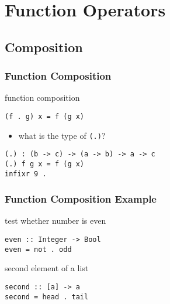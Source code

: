 \documentclass[dvipsnames]{beamer}
\theoremstyle{plain}
\begin{document}
\section{Function Operators}

\subsection{Composition}

\begin{frame}[fragile]
  \frametitle{Function Composition}

  \begin{block}{function composition}
    \begin{lstlisting}
(f . g) x = f (g x)
    \end{lstlisting}
  \end{block}

  \pause
  \begin{itemize}
    \item what is the type of \lstinline|(.)|?
  \end{itemize}

  \begin{exampleblock}{}
    \begin{lstlisting}
(.) : (b -> c) -> (a -> b) -> a -> c
(.) f g x = f (g x)
infixr 9 .
    \end{lstlisting}
  \end{exampleblock}
\end{frame}

\begin{frame}[fragile]
  \frametitle{Function Composition Example}

  \begin{exampleblock}{test whether number is even}
    \begin{lstlisting}
even :: Integer -> Bool
even = not . odd
    \end{lstlisting}
  \end{exampleblock}

  \pause
  \begin{exampleblock}{second element of a list}
    \begin{lstlisting}
second :: [a] -> a
second = head . tail
    \end{lstlisting}
  \end{exampleblock}
\end{frame}
\end{document}
